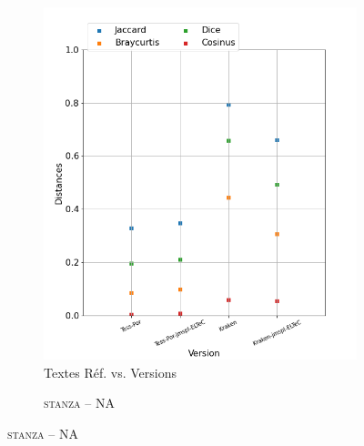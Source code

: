 \begin{figure}[H]
\begin{minipage}{6cm}
  \begin{subfigure}{0.89\textwidth}
  \includegraphics[width=.89\textwidth]{IMAGES/ELTeC_DISTANCES_spaCy3.5.1/DINIZ-graph-dist-spaCy3.5.1-txt.png} 
  \caption{Textes Réf. vs. Versions}
  \label{fig:DINIZ-graph-dist-txt}
  \end{subfigure}
  \end{minipage}
  \begin{minipage}{6cm}
  \begin{subfigure}{0.89\textwidth}
   \caption{\textsc{stanza} -- NA}
 

\end{subfigure}
\end{minipage}
\end{figure}
